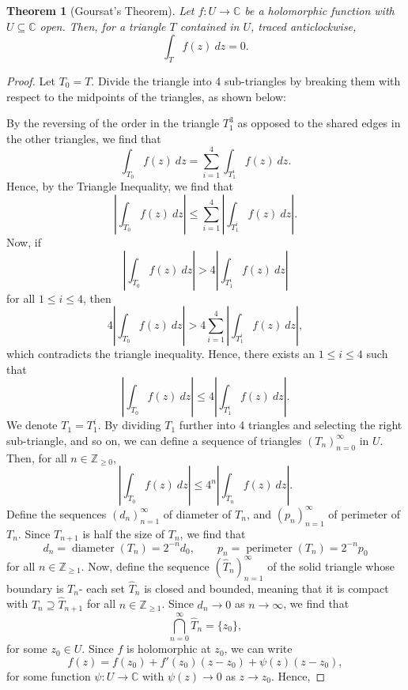 \documentclass[a4paper, openany]{memoir}
\theoremstyle{definition}
\theoremstyle{plain}
\newtheorem{theorem}[definition]{Theorem}
\begin{document}
    \begin{theorem}[Goursat's Theorem]
        Let $f \colon U \to \mathbb{C}$ be a holomorphic function with $U \subseteq \mathbb{C}$ open. Then, for a triangle $T$ contained in $U$, traced anticlockwise, 
        \[\int_T f(z) \ dz = 0.\]
    \end{theorem}
    \begin{proof}
        Let $T_0 = T$. Divide the triangle into 4 sub-triangles by breaking them with respect to the midpoints of the triangles, as shown below:
        
        \noindent By the reversing of the order in the triangle $T_1^3$ as opposed to the shared edges in the other triangles, we find that
        \[\int_{T_0} f(z) \ dz = \sum_{i=1}^4 \int_{T_1^i} f(z) \ dz.\]
        Hence, by the Triangle Inequality, we find that
        \[\left|\int_{T_0} f(z) \ dz\right| \leq \sum_{i=1}^4 \left|\int_{T_1^i} f(z) \ dz\right|.\]
        Now, if 
        \[\left| \int_{T_0} f(z) \ dz\right| > 4\left|\int_{T_1^{i}} f(z) \ dz\right|\]
        for all $1 \leq i \leq 4$, then
        \[4\left|\int_{T_0} f(z) \ dz\right| > 4 \sum_{i=1}^4 \left|\int_{T_1^i} f(z) \ dz \right|,\]
        which contradicts the triangle inequality. Hence, there exists an $1 \leq i \leq 4$ such that 
        \[\left|\int_{T_0} f(z) \ dz\right| \leq 4 \left|\int_{T_1^i} f(z) \ dz\right|.\]
        We denote $T_1 = T_1^i$. By dividing $T_1$ further into 4 triangles and selecting the right sub-triangle, and so on, we can define a sequence of triangles $(T_n)_{n=0}^\infty$ in $U$. Then, for all $n \in \mathbb{Z}_{\geq 0}$,
        \[\left|\int_{T_0} f(z) \ dz\right| \leq 4^n \left|\int_{T_n} f(z) \ dz\right|.\]
        Define the sequences $(d_n)_{n=1}^\infty$ of diameter of $T_n$, and $(p_n)_{n=1}^\infty$ of perimeter of $T_n$. Since $T_{n+1}$ is half the size of $T_n$, we find that
        \[d_n = \operatorname{diameter}(T_n) = 2^{-n} d_0, \qquad p_n = \operatorname{perimeter}(T_n) = 2^{-n} p_0\]
        for all $n \in \mathbb{Z}_{\geq 1}$. Now, define the sequence $(\hat{T}_n)_{n=1}^\infty$ of the solid triangle whose boundary is $T_n$- each set $\hat{T}_n$ is closed and bounded, meaning that it is compact with $\hat{T}_n \supseteq \hat{T}_{n+1}$ for all $n \in \mathbb{Z}_{\geq 1}$. Since $d_n \to 0$ as $n \to \infty$, we find that
        \[\bigcap_{n=0}^\infty \hat{T}_n = \{z_0\},\]
        for some $z_0 \in U$. Since $f$ is holomorphic at $z_0$, we can write
        \[f(z) = f(z_0) + f'(z_0)(z - z_0) + \psi(z)(z - z_0),\]
        for some function $\psi \colon U \to \mathbb{C}$ with $\psi(z) \to 0$ as $z \to z_0$. Hence,

\end{proof}
\end{document}

